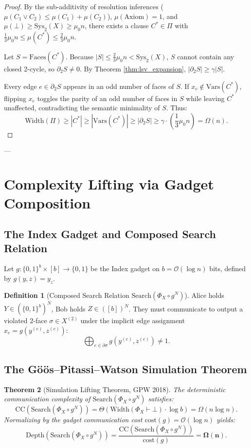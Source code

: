 \documentclass[11pt,a4paper]{article}
\theoremstyle{plain}
\newtheorem{theorem}{Theorem}[section]
\theoremstyle{definition}
\newtheorem{definition}[theorem]{Definition}
\theoremstyle{remark}
\newcommand{\Width}{\mathrm{Width}}
\newcommand{\Depth}{\mathrm{Depth}}
\newcommand{\CC}{\mathrm{CC}}
\newcommand{\Search}{\mathrm{Search}}
\newcommand{\Faces}{\mathrm{Faces}}
\newcommand{\Vars}{\mathrm{Vars}}
\begin{document}
\begin{proof}
By the sub-additivity of resolution inferences ($\mu(C_1 \lor C_2) \le \mu(C_1) + \mu(C_2)$), $\mu(\mathrm{Axiom}) = 1$, and $\mu(\bot) \ge \mathrm{Sys}_2(X) \ge \mu_0 n$, there exists a clause $C^* \in \Pi$ with $\frac{1}{3}\mu_0 n \le \mu(C^*) \le \frac{2}{3}\mu_0 n$.

Let $S = \Faces(C^*)$. Because $|S| \le \frac{2}{3}\mu_0 n < \mathrm{Sys}_2(X)$, $S$ cannot contain any closed 2-cycle, so $\partial_2 S \neq 0$. By Theorem \ref{thm:lsv_expansion}, $|\partial_2 S| \ge \gamma |S|$. 

Every edge $e \in \partial_2 S$ appears in an odd number of faces of $S$. If $x_e \notin \Vars(C^*)$, flipping $x_e$ toggles the parity of an odd number of faces in $S$ while leaving $C^*$ unaffected, contradicting the semantic minimality of $S$. Thus:
\[
\Width(\Pi) \ge |C^*| \ge |\Vars(C^*)| \ge |\partial_2 S| \ge \gamma \cdot \left(\frac{1}{3}\mu_0 n\right) = \Omega(n).
\]
\end{proof}

---

\section{Complexity Lifting via Gadget Composition}

\subsection{The Index Gadget and Composed Search Relation}

Let $g: \{0,1\}^b \times [b] \to \{0,1\}$ be the Index gadget on $b = \mathcal{O}(\log n)$ bits, defined by $g(y, z) = y_z$.

\begin{definition}[Composed Search Relation $\Search(\Phi_X \circ g^N)$]
Alice holds $Y \in (\{0,1\}^b)^N$, Bob holds $Z \in ([b])^N$. They must communicate to output a violated 2-face $\sigma \in X^{(2)}$ under the implicit edge assignment $x_e = g(y^{(e)}, z^{(e)})$:
\[
\bigoplus_{e \in \partial \sigma} g(y^{(e)}, z^{(e)}) \neq 1.
\]
\end{definition}

\subsection{The Göös--Pitassi--Watson Simulation Theorem}

\begin{theorem}[Simulation Lifting Theorem, GPW 2018]\label{thm:gpw_sim}
The deterministic communication complexity of $\Search(\Phi_X \circ g^N)$ satisfies:
\[
\CC(\Search(\Phi_X \circ g^N)) = \Theta\left( \Width(\Phi_X \vdash \bot) \cdot \log b \right) = \Omega(n \log n).
\]
Normalizing by the gadget communication cost $\mathrm{cost}(g) = \mathcal{O}(\log n)$ yields:
\[
\Depth(\Search(\Phi_X \circ g^N)) = \frac{\CC(\Search(\Phi_X \circ g^N))}{\mathrm{cost}(g)} = \mathbf{\Omega(n)}.
\]
\end{theorem}
\end{document}
